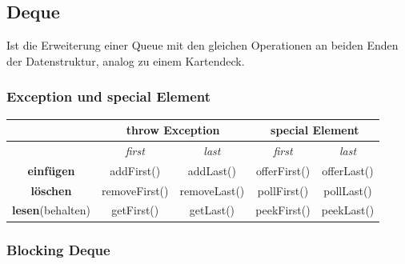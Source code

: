 \documentclass[12pt,a4]{article}
\begin{document}
	\subsection{Deque}
	Ist die Erweiterung einer Queue mit den gleichen Operationen an beiden Enden der Datenstruktur, analog zu einem Kartendeck.
	\subsubsection{Exception und special Element}
	
\begin{tabular}{|c|c|c|c|c|}
	\hline 
	&\multicolumn{2}{|c|}{\textbf{throw Exception}}&\multicolumn{2}{|c|}{\textbf{special Element}} \\
	\hline 
	&\textit{first}&\textit{last}&\textit{first}&\textit{last}  \\ 
	\hline 
	\textbf{einfügen}&addFirst()&addLast()&offerFirst()&offerLast()\\ 
	\hline 
	\textbf{löschen}&  removeFirst()&removeLast()&pollFirst()&pollLast()\\ 
	\hline 
	\textbf{lesen}(behalten)&getFirst()&getLast()&peekFirst()&peekLast()\\ 
	\hline 
\end{tabular} 

	\subsubsection{Blocking Deque}

	
	
	
	
	
	
	
	
	
\end{document}
